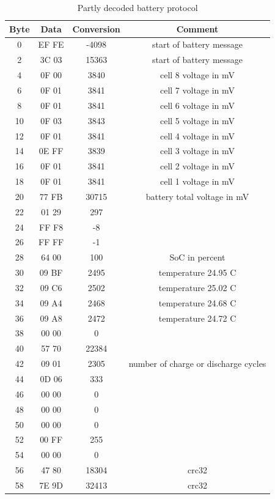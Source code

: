 \documentclass[11pt]{article}
\begin{document}
        \begin{table}
            \centering
            \begin{tabular}{|c|c|c|c|}
                \hline
                Byte & Data & Conversion & Comment \\
                \hline
                0 & EF FE & -4098 & start of battery message \\
                2 & 3C 03 & 15363 & start of battery message \\
                4 & 0F 00 & 3840 & cell 8 voltage in mV \\
                6 & 0F 01 & 3841 & cell 7 voltage in mV \\
                8 & 0F 01 & 3841 & cell 6 voltage in mV \\
                10 & 0F 03 & 3843 & cell 5 voltage in mV \\
                12 & 0F 01 & 3841 & cell 4 voltage in mV \\
                14 & 0E FF & 3839 & cell 3 voltage in mV \\
                16 & 0F 01 & 3841 & cell 2 voltage in mV \\
                18 & 0F 01 & 3841 & cell 1 voltage in mV \\
                20 & 77 FB & 30715 & battery total voltage in mV \\
                22 & 01 29 & 297 &  \\
                24 & FF F8 & -8 &  \\
                26 & FF FF & -1 &  \\
                28 & 64 00 & 100 & SoC in percent \\
                30 & 09 BF & 2495 & temperature 24.95 C \\
                32 & 09 C6 & 2502 & temperature 25.02 C \\
                34 & 09 A4 & 2468 & temperature 24.68 C \\
                36 & 09 A8 & 2472 & temperature 24.72 C \\
                38 & 00 00 & 0 &  \\
                40 & 57 70 & 22384 &  \\
                42 & 09 01 & 2305 & number of charge or discharge cycles \\
                44 & 0D 06 & 333 &  \\
                46 & 00 00 & 0 &  \\
                48 & 00 00 & 0 &  \\
                50 & 00 00 & 0 &  \\
                52 & 00 FF & 255 &  \\
                54 & 00 00 & 0 &  \\
                56 & 47 80 & 18304 & crc32 \\
                58 & 7E 9D & 32413 & crc32 \\
                \hline
                \end{tabular}
                \label{table:battery_protocol}
            \caption{Partly decoded battery protocol}
        \end{table}
\end{document}

